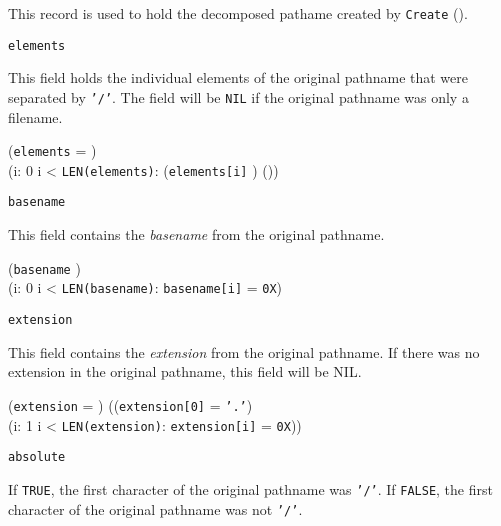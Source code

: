 \begin{semantics}
  This record is used to hold the decomposed pathame created by
  \texttt{Create} ().

  \begin{description}
  \item{\texttt{elements}}

    This field holds the individual elements of the original pathname
    that were separated by \texttt{'/'}.  The field will be
    \texttt{NIL} if the original pathname was only a filename.

    \begin{invariant}
      (\texttt{elements} = \nil) \logicalor \\
      (\forall i: 0 \leq i < \texttt{LEN(elements\deref)}:
      (\texttt{elements[i]} \neq \nil) \logicaland ())
    \end{invariant}

    \item{\texttt{basename}}

      This field contains the \emph{basename} from the original pathname.

    \begin{invariant}
      (\texttt{basename} \neq \nil) \logicaland \\
      (\exists i: 0 \leq i < \texttt{LEN(basename\deref)}:
      \texttt{basename[i]} = \texttt{0X})
    \end{invariant}

    \item{\texttt{extension}}

      This field contains the \emph{extension} from the original
      pathname.  If there was no extension in the original pathname,
      this field will be NIL.

    \begin{invariant}
      (\texttt{extension} = \nil) \logicalor
      ((\texttt{extension[0]} = \texttt{'.'}) \logicaland \\
      (\exists i: 1 \leq i < \texttt{LEN(extension\deref)}:
      \texttt{extension[i]} = \texttt{0X}))
    \end{invariant}

    \item{\texttt{absolute}}

      If \texttt{TRUE}, the first character of the original pathname
      was \texttt{'/'}.  If \texttt{FALSE}, the first character of the
      original pathname was not \texttt{'/'}.
  \end{description}
\end{semantics}


